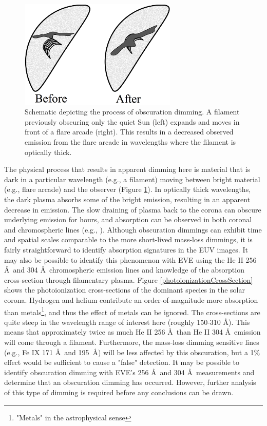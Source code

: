 \begin{figure}[!h]
    \caption[Schematic of obscuration dimming]{
        Schematic depicting the process of obscuration dimming. A filament previously obscuring only the quiet Sun (left)
        expands and moves in front of a flare arcade (right). This results in a decreased observed emission from the flare
        arcade in wavelengths where the filament is optically thick.
    }
    \begin{center}
        \includegraphics[width=75mm]{Images/ObscurationDimming.png}
    \end{center}
    \label{obscurationDimming}
\end{figure}

The physical process that results in apparent dimming here is material that is dark in a particular wavelength (e.g., a filament) moving between bright material (e.g., flare arcade) and the observer (Figure \ref{obscurationDimming}). In optically thick wavelengths, the dark plasma absorbs some of the bright emission, resulting in an apparent decrease in emission. The slow draining of plasma back to the corona can obscure underlying emission for hours, and absorption can be observed in both coronal and chromospheric lines (e.g., \citealt{Gilbert2013}). Although obscuration dimmings can exhibit time and spatial scales comparable to the more short-lived mass-loss dimmings, it is fairly straightforward to identify absorption signatures in the EUV images. It may also be possible to identify this phenomenon with EVE using the He II 256 \AA\ and 304 \AA\ chromospheric emission lines and knowledge of the absorption cross-section through filamentary plasma. Figure \ref{photoionizationCrossSection} shows the photoionization cross-sections of the dominant species in the solar corona. Hydrogen and helium contribute an order-of-magnitude more absorption than metals\footnote{"Metals" in the astrophysical sense}, and thus the effect of metals can be ignored. The cross-sections are quite steep in the wavelength range of interest here (roughly 150-310 \AA). This means that approximately twice as much He II 256 \AA\ than He II 304 \AA\ emission will come through a filament. Furthermore, the mass-loss dimming sensitive lines (e.g., Fe IX 171 \AA\ and 195 \AA) will be less affected by this obscuration, but a 1\% effect would be sufficient to cause a "false" detection. It may be possible to identify obscuration dimming with EVE's 256 \AA\ and 304 \AA\ measurements and determine that an obscuration dimming has occurred. However, further analysis of this type of dimming is required before any conclusions can be drawn. 


